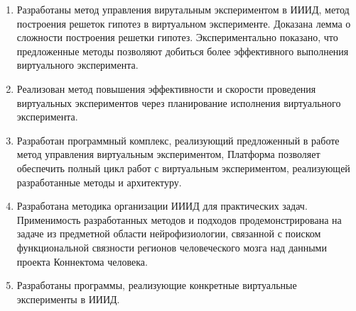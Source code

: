 \begin{enumerate}
  \item Разработаны метод управления вирутальным экспериментом в ИИИД, метод построения решеток гипотез в виртуальном 
        эксперименте. Доказана лемма о сложности построения решетки гипотез.  Экспериментально показано, что 
        предложенные методы позволяют добиться более эффективного выполнения виртуального эксперимента.
  \item Реализован метод повышения эффективности и скорости проведения виртуальных экспериментов через планирование 
        исполнения виртуального эксперимента.
  \item Разработан программный комплекс, реализующий предложенный в работе метод управления виртуальным экспериментом,
        Платформа позволяет обеспечить полный цикл работ с виртуальным экспериментом, 
        реализующей разработанные методы и архитектуру.
  \item Разработана методика организации ИИИД для практических задач. Применимость разработанных методов и подходов продемонстрирована на задаче 
        из предметной области нейрофизиологии, связанной с поиском функциональной связности 
        регионов человеческого мозга над данными проекта Коннектома человека.  
  \item Разработаны программы, реализующие конкретные виртуальные эксперименты в ИИИД. 
\end{enumerate}




